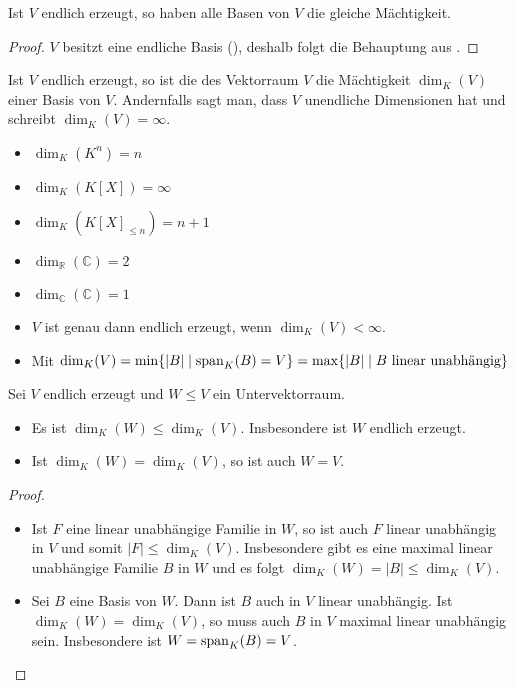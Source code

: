 \begin{conclusion}
	Ist $V$ endlich erzeugt, so haben alle Basen von $V$ die gleiche Mächtigkeit.
\end{conclusion}
\begin{proof}
	$V$ besitzt eine endliche Basis (), deshalb folgt die Behauptung aus .
\end{proof}

\begin{definition}[Dimension]
	Ist $V$ endlich erzeugt, so ist die  des Vektorraum $V$ die Mächtigkeit $\dim_K(V)$ 
	einer Basis von $V$. Andernfalls sagt man, dass $V$ unendliche Dimensionen hat und schreibt $\dim_K(V)= \infty$. 
\end{definition}

\begin{example}
	\begin{itemize}
		\item $\dim_K(K^n)=n$
		\item $\dim_K(K[X])=\infty$
		\item $\dim_K(K[X]_{\le n})=n+1$
		\item $\dim_{\mathbb R}(\mathbb C)=2$
		\item $\dim_{\mathbb C}(\mathbb C)=1$
	\end{itemize}
\end{example}

\begin{remark}
	\begin{itemize}
		\item $V$ ist genau dann endlich erzeugt, wenn $\dim_K(V)< \infty$.
		\item Mit  $\dim_K(V)=\min\{|B| \mid \operatorname{span}_K(B)=V\}=\max\{|B| \mid B\text{ linear unabhängig}\}$
	\end{itemize}
\end{remark}

\begin{proposition}
	Sei $V$ endlich erzeugt und $W\le V$ ein Untervektorraum.
	\begin{itemize}
		\item Es ist $\dim_K(W)\le \dim_K(V)$. Insbesondere ist $W$ endlich erzeugt.
		\item Ist $\dim_K(W)=\dim_K(V)$, so ist auch $W=V$.
	\end{itemize}
\end{proposition}
\begin{proof}
	\begin{itemize}
		\item Ist $F$ eine linear unabhängige Familie in $W$, so ist auch $F$ linear unabhängig in $V$ und somit $|F|\le 
		\dim_K(V)$. Insbesondere gibt es eine maximal linear unabhängige Familie $B$ in $W$ und es folgt $\dim_K(W)=|B|
		\le \dim_K(V)$.
		\item Sei $B$ eine Basis von $W$. Dann ist $B$ auch in $V$ linear unabhängig. Ist $\dim_K(W)=\dim_K(V)$, so muss 
		auch $B$ in $V$ maximal linear unabhängig sein. Insbesondere ist $W=\operatorname{span}_K(B)=V$.
	\end{itemize}
\end{proof}